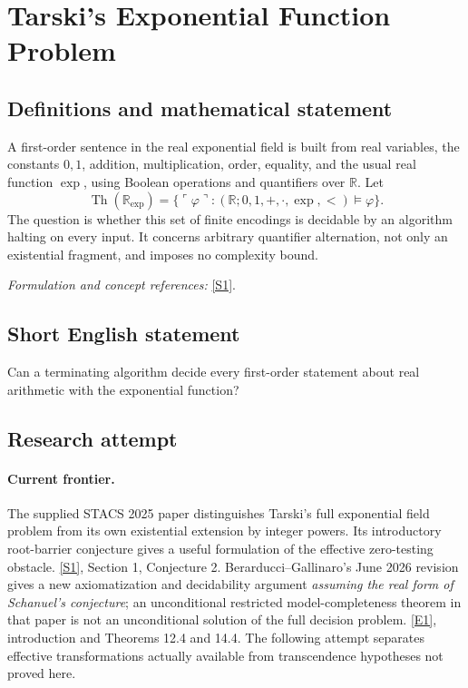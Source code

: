 \documentclass[11pt,a4paper]{article}
\newcommand{\R}{\mathbb{R}}
\newcommand{\sref}[2]{\hyperlink{source:#1:#2}{[S#2]}}
\newcommand{\eref}[2]{\hyperlink{extra:#1:#2}{[E#2]}}
\newif\ifshowcatalogue
\newcommand{\cataloguescope}[1]{\ifshowcatalogue
 \paragraph{Exact scope in the supplied catalogue.}
 \begin{quote}\small #1\end{quote}\fi}
\numberwithin{equation}{section}
\begin{document}
\setcounter{section}{123}
\clearpage
\section{\texorpdfstring{Tarski's Exponential Function Problem}{Tarski's Exponential Function Problem}}\label{124}
\subsection{Definitions and mathematical statement}
A first-order sentence in the real exponential field is built from real variables, the constants $0,1$, addition, multiplication, order, equality, and the usual real function $\exp$, using Boolean operations and quantifiers over $\R$. Let
\[
 \operatorname{Th}(\R_{\exp})=\{\ulcorner\varphi\urcorner:(\R;0,1,+,\cdot,\exp,<)\models\varphi\}.
\]
The question is whether this set of finite encodings is decidable by an algorithm halting on every input. It concerns arbitrary quantifier alternation, not only an existential fragment, and imposes no complexity bound.
\par\smallskip\textit{Formulation and concept references:} \sref{124}{1}.
\cataloguescope{Determine whether the first-order theory of the real exponential field (R; 0, 1, +, *, exp, <, =) is decidable.}
\subsection{Short English statement}
Can a terminating algorithm decide every first-order statement about real arithmetic with the exponential function?
\subsection{Research attempt}

\paragraph{Current frontier.}
The supplied STACS 2025 paper distinguishes Tarski's full exponential
field problem from its own existential extension by integer powers.
Its introductory root-barrier conjecture gives a useful formulation of
the effective zero-testing obstacle. \sref{124}{1}, Section 1,
Conjecture 2.
Berarducci--Gallinaro's June 2026 revision gives a new axiomatization and
decidability argument \emph{assuming the real form of Schanuel's
conjecture}; an unconditional restricted model-completeness theorem in
that paper is not an unconditional solution of the full decision
problem. \eref{124}{1}, introduction and Theorems 12.4 and 14.4.
The following attempt separates effective transformations actually
available from transcendence hypotheses not proved here.
\end{document}
